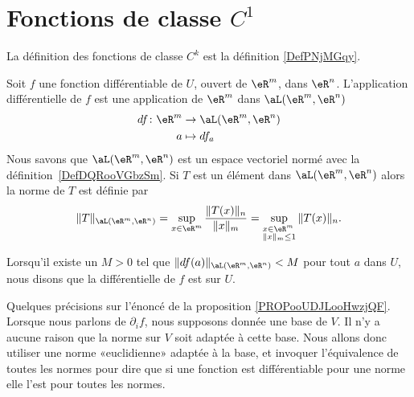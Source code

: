 
\section{Fonctions de classe \texorpdfstring{\(  C^1\)}{C1}}

La définition des fonctions de classe \( C^k\) est la définition \ref{DefPNjMGqy}.

Soit \( f\) une fonction différentiable de \( U\), ouvert de \( \eR^m\), dans \( \eR^n\). L'application différentielle de \( f\) est une application  de \( \eR^m\) dans \( \aL(\eR^m, \eR^n)\)
\begin{equation}
	\begin{aligned}
		df\colon \eR^m & \to \aL(\eR^m,\eR^n) \\
		a              & \mapsto df_a
	\end{aligned}
\end{equation}
Nous savons que \( \aL(\eR^m, \eR^n)\) est un espace vectoriel normé avec la définition~\ref{DefDQRooVGbzSm}. Si \( T\) est un élément dans \( \aL(\eR^m, \eR^n)\) alors la norme de \( T\) est définie par
\[
	\|T\|_{\aL(\eR^m, \eR^n)}=\sup_{x\in\eR^m} \frac{\|T(x)\|_n}{\|x\|_m}=\sup_{\begin{subarray}{l}
			x\in\eR^m\\
			\|x\|_m\leq 1
		\end{subarray}} \|T(x)\|_n.
\]

Lorsqu'il existe un \( M>0\) tel que \( \| df(a) \|_{\aL(\eR^m,\eR^n)}<M\) pour tout \( a\) dans \( U\), nous disons que la différentielle de \( f\) est  sur \( U\).

\begin{normaltext}      \label{NORMooDAZZooDiGFoW}
	Quelques précisions sur l'énoncé de la proposition \ref{PROPooUDJLooHwzjQF}. Lorsque nous parlons de \( \partial_if\), nous supposons donnée une base de \( V\). Il n'y a aucune raison que la norme sur \( V\) soit adaptée à cette base. Nous allons donc utiliser une norme «euclidienne» adaptée à la base, et invoquer l'équivalence de toutes les normes pour dire que si une fonction est différentiable pour une norme elle l'est pour toutes les normes.
\end{normaltext}

